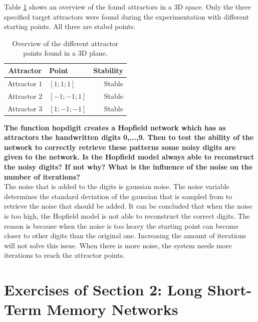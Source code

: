 \documentclass[a4paper,10pt]{article}
\begin{document}
Table \ref{tab:att3} shows an overview of the found attractors in a 3D space. Only the three specified target attractors were found during the experimentation with different starting points. All three are stabel points. 
\begin{table}
	\centering
	\begin{tabular}{@{}clr@{}} \toprule
		\textbf{Attractor} & \textbf{Point} & \textbf{Stability}\\\midrule
		Attractor $ 1 $ & $ [1;1;1] $ & Stable\\
		Attractor $ 2 $ & $ [-1;-1;1] $ & Stable\\
		Attractor $ 3 $ & $ [1;-1;-1] $ & Stable\\\bottomrule
	\end{tabular}
	\caption{Overview of the different attractor points found in a 3D plane.}
	\label{tab:att3}
\end{table}
\newpage
\textbf{The function hopdigit creates a Hopfield network which has as attractors the handwritten digits 0,...,9. Then to test
	the ability of the network to correctly retrieve these patterns some noisy digits are given to the network. Is the Hopfield
	model always able to reconstruct the noisy digits? If not why? What is the influence of the noise on the number of
	iterations?}\\

The noise that is added to the digits is gaussian noise. The noise variable determines the standard deviation of the gaussian that is sampled from to retrieve the noise that should be added. It can be concluded that when the noise is too high, the Hopfield model is not able to reconstruct the correct digits. The reason is because when the noise is too heavy the starting point can become closer to other digits than the original one. Increasing the amount of iterations will not solve this issue. When there is more noise, the system needs more iterations to reach the attractor points.

\section{Exercises of Section 2: Long Short-Term Memory Networks}


















%
\end{document}
